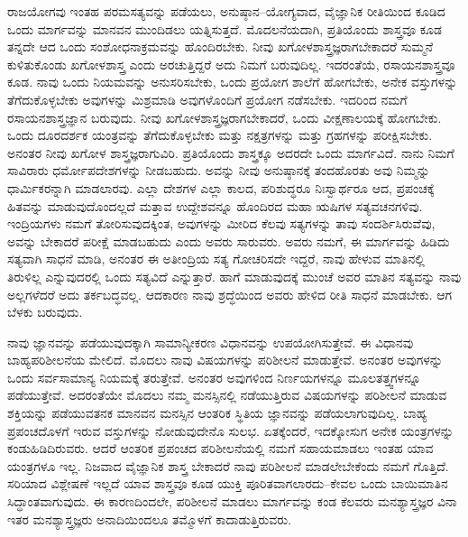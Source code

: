 ರಾಜಯೋಗವು ಇಂತಹ ಪರಮಸತ್ಯವನ್ನು ಪಡೆಯಲು, ಅನುಷ್ಠಾನ–ಯೋಗ್ಯವಾದ, ವೈಜ್ಞಾನಿಕ ರೀತಿಯಿಂದ ಕೂಡಿದ ಒಂದು ಮಾರ್ಗವನ್ನು ಮಾನವನ ಮುಂದಿಡಲು ಯತ್ನಿಸುತ್ತದೆ. ಮೊದಲನೆಯದಾಗಿ, ಪ್ರತಿಯೊಂದು ಶಾಸ್ತ್ರವೂ ಕೂಡ ತನ್ನದೇ ಆದ ಒಂದು ಸಂಶೋಧನಾಕ್ರಮವನ್ನು ಹೊಂದಿರಬೇಕು. ನೀವು ಖಗೋಳಶಾಸ್ತ್ರಜ್ಞರಾಗಬೇಕಾದರೆ ಸುಮ್ಮನೆ ಕುಳಿತುಕೊಂಡು ಖಗೋಳಶಾಸ್ತ್ರ ಎಂದು ಅರಚುತ್ತಿದ್ದರೆ ಅದು ನಿಮಗೆ ಬರುವುದಿಲ್ಲ. ಇದರಂತೆಯೆ, ರಸಾಯನಶಾಸ್ತ್ರವೂ ಕೂಡ. ನಾವು ಒಂದು ನಿಯಮವನ್ನು ಅನುಸರಿಸಬೇಕು, ಒಂದು ಪ್ರಯೋಗ ಶಾಲೆಗೆ ಹೋಗಬೇಕು, ಅನೇಕ ವಸ್ತುಗಳನ್ನು ತೆಗೆದುಕೊಳ್ಳಬೇಕು ಅವುಗಳನ್ನು ಮಿಶ್ರಮಾಡಿ ಅವುಗಳೊಂದಿಗೆ ಪ್ರಯೋಗ ನಡೆಸಬೇಕು. ಇದರಿಂದ ನಮಗೆ ರಸಾಯನಶಾಸ್ತ್ರಜ್ಞಾನ ಬರುವುದು. ನೀವು ಖಗೋಳಶಾಸ್ತ್ರಜ್ಞರಾಗಬೇಕಾದರೆ, ಒಂದು ವೀಕ್ಷಣಾಲಯಕ್ಕೆ ಹೋಗಬೇಕು. ಒಂದು ದೂರದರ್ಶಕ ಯಂತ್ರವನ್ನು ತೆಗೆದುಕೊಳ್ಳಬೇಕು ಮತ್ತು ನಕ್ಷತ್ರಗಳನ್ನು ಮತ್ತು ಗ್ರಹಗಳನ್ನು ಪರೀಕ್ಷಿಸಬೇಕು. ಅನಂತರ ನೀವು ಖಗೋಳ ಶಾಸ್ತ್ರಜ್ಞರಾಗುವಿರಿ. ಪ್ರತಿಯೊಂದು ಶಾಸ್ತ್ರಕ್ಕೂ ಅದರದೇ ಒಂದು ಮಾರ್ಗವಿದೆ. ನಾನು ನಿಮಗೆ ಸಾವಿರಾರು ಧರ್ಮೋಪದೇಶಗಳನ್ನು ನೀಡಬಹುದು. ಅವನ್ನು ನೀವು ಅನುಷ್ಠಾನಕ್ಕೆ ತಂದಹೊರತು ಅವು ನಿಮ್ಮನ್ನು ಧಾರ್ಮಿಕರನ್ನಾಗಿ ಮಾಡಲಾರವು. ಎಲ್ಲಾ ದೇಶಗಳ ಎಲ್ಲಾ ಕಾಲದ, ಪರಿಶುದ್ಧರೂ ನಿಃಸ್ವಾರ್ಥರೂ ಆದ, ಪ್ರಪಂಚಕ್ಕೆ ಹಿತವನ್ನು ಮಾಡುವುದೊಂದಲ್ಲದೆ ಮತ್ತಾವ ಉದ್ದೇಶವನ್ನೂ ಹೊಂದಿರದ ಮಹಾ ಋಷಿಗಳ ಸತ್ಯವಚನಗಳಿವು. ಇಂದ್ರಿಯಗಳು ನಮಗೆ ತೋರಿಸುವುದಕ್ಕಿಂತ, ಅವುಗಳನ್ನು ಮೀರಿದ ಕೆಲವು ಸತ್ಯಗಳನ್ನು ತಾವು ಸಂದರ್ಶಿಸಿರುವೆವು, ಅವನ್ನು ಬೇಕಾದರೆ ಪರೀಕ್ಷೆ ಮಾಡಬಹುದು ಎಂದು ಅವರು ಸಾರುವರು. ಅವರು ನಮಗೆ, ಈ ಮಾರ್ಗವನ್ನು ಹಿಡಿದು ಸತ್ಯವಾಗಿ ಸಾಧನೆ ಮಾಡಿ, ಅನಂತರ ಈ ಅತೀಂದ್ರಿಯ ಸತ್ಯ ಗೋಚರಿಸದೇ ಇದ್ದರೆ, ನಾವು ಹೇಳುವ ಮಾತಿನಲ್ಲಿ ತಿರುಳಿಲ್ಲ ಎನ್ನುವುದರಲ್ಲಿ ಒಂದು ಸತ್ಯವಿದೆ ಎನ್ನುತ್ತಾರೆ. ಹಾಗೆ ಮಾಡುವುದಕ್ಕೆ ಮುಂಚೆ ಅವರ ಮಾತಿನ ಸತ್ಯವನ್ನು ನಾವು ಅಲ್ಲಗಳೆದರೆ ಅದು ತರ್ಕಬದ್ಧವಲ್ಲ. ಆದಕಾರಣ ನಾವು ಶ್ರದ್ಧೆಯಿಂದ ಅವರು ಹೇಳಿದ ರೀತಿ ಸಾಧನೆ ಮಾಡಬೇಕು. ಆಗ ಬೆಳಕು ಬರುವುದು. 

\vskip 0.5cm

ನಾವು ಜ್ಞಾನವನ್ನು ಪಡೆಯುವುದಕ್ಕಾಗಿ ಸಾಮಾನ್ಯೀಕರಣ ವಿಧಾನವನ್ನು ಉಪ\break ಯೋಗಿಸುತ್ತೇವೆ. ಈ ವಿಧಾನವು ಬಾಹ್ಯಪರಿಶೀಲನೆಯ ಮೇಲಿದೆ. ಮೊದಲು ನಾವು ವಿಷಯಗಳನ್ನು ಪರಿಶೀಲನೆ ಮಾಡುತ್ತೇವೆ. ಅನಂತರ ಅವುಗಳನ್ನು ಒಂದು ಸರ್ವಸಾಮಾನ್ಯ ನಿಯಮಕ್ಕೆ ತರುತ್ತೇವೆ. ಅನಂತರ ಅವುಗಳಿಂದ ನಿರ್ಣಯಗಳನ್ನೂ ಮೂಲತತ್ತ್ವಗಳನ್ನೂ ಪಡೆಯುತ್ತೇವೆ. ಅದರಂತೆಯೇ ಮೊದಲು ನಮ್ಮ ಮನಸ್ಸಿನಲ್ಲಿ ನಡೆಯುತ್ತಿರುವ ವಿಷಯಗಳನ್ನು ಪರಿಶೀಲನೆ ಮಾಡುವ ಶಕ್ತಿಯನ್ನು ಪಡೆಯುವತನಕ ಮಾನವನ ಮನಸ್ಸಿನ ಆಂತರಿಕ ಸ್ಥಿತಿಯ ಜ್ಞಾನವನ್ನು ಪಡೆಯಲಾಗುವುದಿಲ್ಲ. ಬಾಹ್ಯ ಪ್ರಪಂಚದೊಳಗೆ ಇರುವ ವಸ್ತುಗಳನ್ನು ನೋಡುವುದೇನೊ ಸುಲಭ. ಏತಕ್ಕೆಂದರೆ, ಇದಕ್ಕೋಸುಗ ಅನೇಕ ಯಂತ್ರಗಳನ್ನು ಕಂಡುಹಿಡಿದಿರುವರು. ಆದರೆ ಆಂತರಿಕ ಪ್ರಪಂಚದ ಪರಿಶೀಲನೆಯಲ್ಲಿ ನಮಗೆ ಸಹಾಯಮಾಡಲು ಇಂತಹ ಯಾವ ಯಂತ್ರಗಳೂ ಇಲ್ಲ. ನಿಜವಾದ ವೈಜ್ಞಾನಿಕ ಶಾಸ್ತ್ರ ಬೇಕಾದರೆ ನಾವು ಪರಿಶೀಲನೆ ಮಾಡಲೇಬೇಕೆಂದು ನಮಗೆ ಗೊತ್ತಿದೆ. ಸರಿಯಾದ ವಿಶ್ಲೇಷಣೆ ಇಲ್ಲದೆ ಯಾವ ಶಾಸ್ತ್ರವೂ ಕೂಡ ಯುಕ್ತಿ ಪೂರಿತವಾಗಲಾರದು–ಕೇವಲ ಒಂದು ಬಾಯಿಮಾತಿನ ಸಿದ್ಧಾಂತವಾಗುವುದು. ಈ ಕಾರಣದಿಂದಲೇ, ಪರಿಶೀಲನೆ ಮಾಡಲು ಮಾರ್ಗವನ್ನು ಕಂಡ ಕೆಲವರು ಮನಶ್ಯಾಸ್ತ್ರಜ್ಞರ ವಿನಾ ಇತರ ಮನಶ್ಯಾಸ್ತ್ರಜ್ಞರು ಅನಾದಿಯಿಂದಲೂ ತಮ್ಮೊಳಗೆ ಕಾದಾಡುತ್ತಿರುವರು. 

\vskip 5pt

